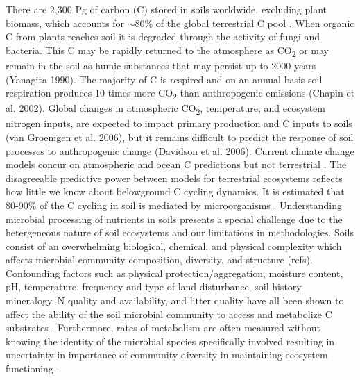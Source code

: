 There are 2,300 Pg of carbon (C) stored in soils worldwide, excluding plant biomass, which accounts for $\sim$80\% of the global terrestrial C pool \cite{Amundson_2001,Mendelsohn_2001,IPCC2007Synth,elsen_Ayres_Wall_Bardgett_2011,Lal_2008,BATJES_1996,Lal_2008}. When organic C from plants reaches soil it is degraded through the activity of fungi and bacteria. This C may be rapidly returned to the atmosphere as CO\textsubscript{2} or may remain in the soil as humic substances that may persist up to 2000 years (Yanagita 1990). The majority of C is respired and on an annual basis soil respiration produces 10 times more CO\textsubscript{2} than anthropogenic emissions (Chapin et al. 2002). Global changes in atmospheric CO\textsubscript{2}, temperature, and ecosystem nitrogen inputs, are expected to impact primary production and C inputs to soils (van Groenigen et al. 2006), but it remains difficult to predict the response of soil processes to anthropogenic change (Davidson et al. 2006). Current climate change models concur on atmospheric and ocean C predictions but not terrestrial \cite{Friedlingstein_2006}. The disagreeable predictive power between models for terrestrial ecosystems reflects how little we know about belowground C cycling dynamics. It is estimated that 80-90\% of the C cycling in soil is mediated by microorganisms \cite{ColemanCrossley_1996,Nannipieri_2003}. Understanding microbial processing of nutrients in soils presents a special challenge due to the hetergeneous nature of soil ecosystems and our limitations in methodologies. Soils consist of an overwhelming biological, chemical, and physical complexity which affects microbial community composition, diversity, and structure (refs). Confounding factors such as physical protection/aggregation, moisture content, pH, temperature, frequency and type of land disturbance, soil history, mineralogy, N quality and availability, and litter quality have all been shown to affect the ability of the soil microbial community to access and metabolize C substrates \cite{Schlesinger_1977,dgett_Wall_Hattenschwiler_2010,Sollins_Homann_Caldwell_1996,Torn_Vitousek_Trumbore_2005,TRUMBORE_2006,Schimel_2012}. Furthermore, rates of metabolism are often measured without knowing the identity of the microbial species specifically involved \cite{ndi_Pietramellara_Renella_2003} resulting in uncertainty in importance of community diversity in maintaining ecosystem functioning \cite{Allison_2008,ndi_Pietramellara_Renella_2003,Schimel_2012}. 

